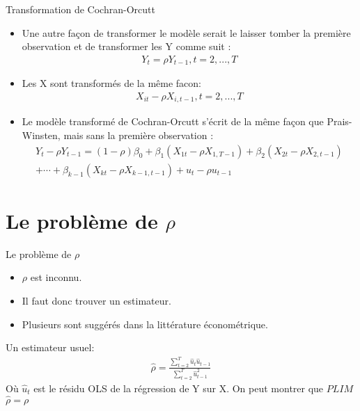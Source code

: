 \documentclass{beamer}
\begin{document}
\frame{\tableofcontents[current]}


\begin{frame}{Transformation de Cochran-Orcutt}
\begin{itemize}
\item Une autre façon de transformer le modèle serait le laisser tomber la première observation et de transformer les Y comme suit :
\begin{align*}
Y_t=\rho Y_{t-1}, t=2,...,T
\end{align*}
\item Les X sont transformés de la même facon:
\begin{align*}
X_{it}-\rho X_{i,t-1}, t=2,...,T
\end{align*}
\item Le modèle transformé de Cochran-Orcutt s’écrit de la même façon que Prais-Winsten, mais sans la première observation :
\begin{align*}
Y_t-\rho Y_{t-1}=(1-\rho) \beta_0+\beta_1 (X_{1t}-\rho X_{1,T-1})+\beta_2 (X_ {2t}-\rho X_{2,t-1}) \\ + \cdots +\beta_{k-1} (X_{kt}-\rho X_{k-1,t-1})+u_t-\rho u_{t-1}
\end{align*} 
\end{itemize}
\end{frame}

\section{Le problème de $\rho$}

\frame{\tableofcontents[current]}


\begin{frame}{Le problème de $\rho$}
\begin{itemize}
\item $\rho$ est inconnu.
\item Il faut donc trouver un estimateur.
\item Plusieurs sont suggérés dans la littérature économétrique.
\end{itemize}
\begin{block}{Un estimateur usuel:}
\begin{align*}
\hat{\rho}=\frac{\sum_{t=2}^T \hat{u}_t \hat{u}_{t-1}}{\sum_{t=2}^T \hat{u}_{t-1}^2}
\end{align*}
Où $\hat{u}_t$ est le résidu OLS de la régression de Y sur X. On peut montrer que $PLIM$ $\hat{\rho}=\rho$
\end{block}
\end{frame}
\end{document}
